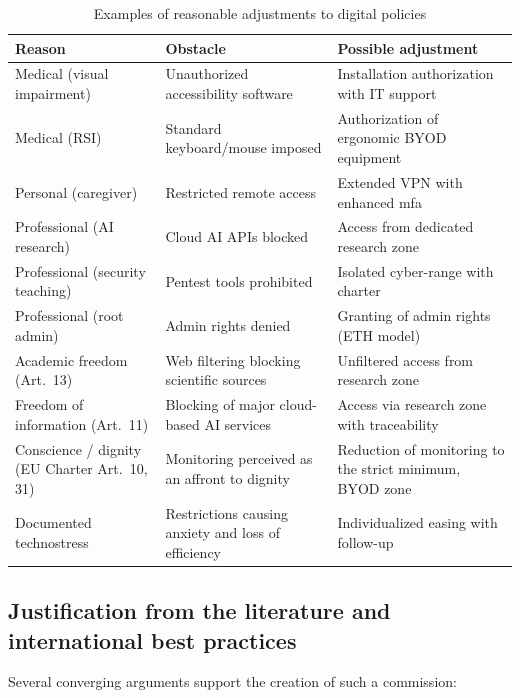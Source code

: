 \begin{table}[H]
\centering
\caption{Examples of reasonable adjustments to digital policies}
\label{tab:ajustements}
\small
\begin{tabularx}{\textwidth}{>{\raggedright\arraybackslash}X >{\raggedright\arraybackslash}X >{\raggedright\arraybackslash}X}
\toprule
\textbf{Reason} & \textbf{Obstacle} & \textbf{Possible adjustment} \\
\midrule
Medical (visual impairment) & Unauthorized accessibility software &
    Installation authorization with IT support \\
\addlinespace
Medical (RSI) & Standard keyboard/mouse imposed &
    Authorization of ergonomic BYOD equipment \\
\addlinespace
Personal (caregiver) & Restricted remote access &
    Extended VPN with enhanced \gls{mfa} \\
\addlinespace
Professional (AI research) & Cloud AI APIs blocked &
    Access from dedicated research zone \\
\addlinespace
Professional (security teaching) & Pentest tools prohibited &
    Isolated cyber-range with charter \\
\addlinespace
Professional (root admin) & Admin rights denied &
    Granting of admin rights (ETH model) \\
\addlinespace
Academic freedom (Art.~13) & Web filtering blocking scientific
    sources & Unfiltered access from research zone \\
\addlinespace
Freedom of information (Art.~11) & Blocking of major cloud-based AI
    services & Access via research zone with traceability \\
\addlinespace
Conscience / dignity (EU Charter Art.~10, 31) & Monitoring perceived as
    an affront to dignity & Reduction of monitoring to the
    strict minimum, BYOD zone \\
\addlinespace
Documented technostress & Restrictions causing anxiety and loss
    of efficiency & Individualized easing with follow-up \\
\bottomrule
\end{tabularx}
\end{table}

\subsection{Justification from the literature and international best practices}

Several converging arguments support the creation of such a
commission:

